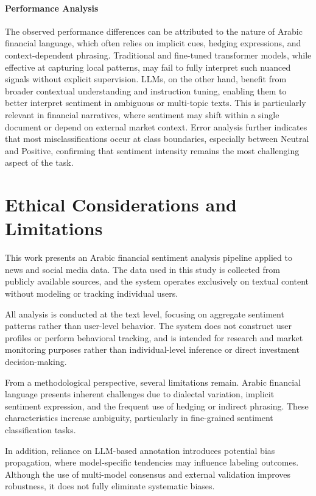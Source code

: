 \documentclass[10pt,a4paper]{article}
\begin{document}
\paragraph{Performance Analysis}
The observed performance differences can be attributed to the nature of Arabic financial language, which often relies on implicit cues, hedging expressions, and context-dependent phrasing. Traditional and fine-tuned transformer models, while effective at capturing local patterns, may fail to fully interpret such nuanced signals without explicit supervision. LLMs, on the other hand, benefit from broader contextual understanding and instruction tuning, enabling them to better interpret sentiment in ambiguous or multi-topic texts. This is particularly relevant in financial narratives, where sentiment may shift within a single document or depend on external market context. Error analysis further indicates that most misclassifications occur at class boundaries, especially between Neutral and Positive, confirming that sentiment intensity remains the most challenging aspect of the task.


\section{Ethical Considerations and Limitations}
This work presents an Arabic financial sentiment analysis pipeline applied to news and social media data. The data used in this study is collected from publicly available sources, and the system operates exclusively on textual content without modeling or tracking individual users.

All analysis is conducted at the text level, focusing on aggregate sentiment patterns rather than user-level behavior. The system does not construct user profiles or perform behavioral tracking, and is intended for research and market monitoring purposes rather than individual-level inference or direct investment decision-making.

From a methodological perspective, several limitations remain. Arabic financial language presents inherent challenges due to dialectal variation, implicit sentiment expression, and the frequent use of hedging or indirect phrasing. These characteristics increase ambiguity, particularly in fine-grained sentiment classification tasks.

In addition, reliance on LLM-based annotation introduces potential bias propagation, where model-specific tendencies may influence labeling outcomes. Although the use of multi-model consensus and external validation improves robustness, it does not fully eliminate systematic biases.
\end{document}
